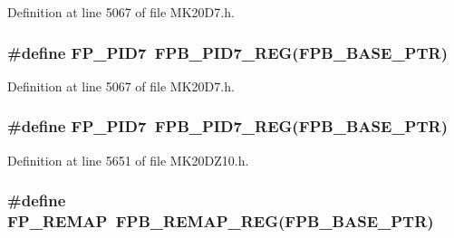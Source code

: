 Definition at line 5067 of file M\+K20\+D7.\+h.

\subsubsection[{\texorpdfstring{F\+P\+\_\+\+P\+I\+D7}{FP_PID7}}]{\setlength{\rightskip}{0pt plus 5cm}\#define F\+P\+\_\+\+P\+I\+D7~{\bf F\+P\+B\+\_\+\+P\+I\+D7\+\_\+\+R\+EG}({\bf F\+P\+B\+\_\+\+B\+A\+S\+E\+\_\+\+P\+TR})}\hypertarget{group___f_p_b___register___accessor___macros_ga8774270b6bf61764eb807be046bafa2d}{}\label{group___f_p_b___register___accessor___macros_ga8774270b6bf61764eb807be046bafa2d}


Definition at line 5067 of file M\+K20\+D7.\+h.

\subsubsection[{\texorpdfstring{F\+P\+\_\+\+P\+I\+D7}{FP_PID7}}]{\setlength{\rightskip}{0pt plus 5cm}\#define F\+P\+\_\+\+P\+I\+D7~{\bf F\+P\+B\+\_\+\+P\+I\+D7\+\_\+\+R\+EG}({\bf F\+P\+B\+\_\+\+B\+A\+S\+E\+\_\+\+P\+TR})}\hypertarget{group___f_p_b___register___accessor___macros_ga8774270b6bf61764eb807be046bafa2d}{}\label{group___f_p_b___register___accessor___macros_ga8774270b6bf61764eb807be046bafa2d}


Definition at line 5651 of file M\+K20\+D\+Z10.\+h.

\subsubsection[{\texorpdfstring{F\+P\+\_\+\+R\+E\+M\+AP}{FP_REMAP}}]{\setlength{\rightskip}{0pt plus 5cm}\#define F\+P\+\_\+\+R\+E\+M\+AP~{\bf F\+P\+B\+\_\+\+R\+E\+M\+A\+P\+\_\+\+R\+EG}({\bf F\+P\+B\+\_\+\+B\+A\+S\+E\+\_\+\+P\+TR})}\hypertarget{group___f_p_b___register___accessor___macros_ga359b40159d279babcfaf6832695ba88b}{}\label{group___f_p_b___register___accessor___macros_ga359b40159d279babcfaf6832695ba88b}


